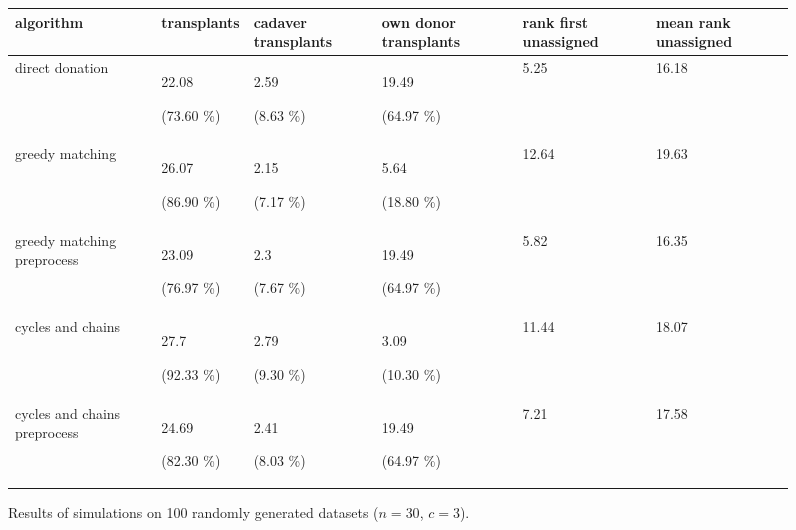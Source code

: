 \documentclass[english]{article}
\begin{document}
\begin{figure}[ht]

    \centering
    \begin{adjustbox}{width=\textwidth}
    \begin{tabular}{|x{0.15\textwidth}|x{0.17\textwidth}|x{0.17\textwidth}|x{0.17\textwidth}|x{0.17\textwidth}|x{0.17\textwidth}|}
        \hline
        \textbf{algorithm} & \textbf{transplants} & \textbf{cadaver transplants} & \textbf{own donor transplants} & \textbf{rank first unassigned} & \textbf{mean rank unassigned} \\
        \hline
        direct donation & 22.08 \par (73.60 \%) & 2.59 \par (8.63 \%) & 19.49 \par (64.97 \%) & 5.25 & 16.18 \\
        \hline
        greedy matching & 26.07 \par (86.90 \%) & 2.15 \par (7.17 \%) & 5.64 \par (18.80 \%) & 12.64 & 19.63 \\
        \hline
        greedy matching preprocess & 23.09 \par (76.97 \%) & 2.3 \par (7.67 \%) & 19.49 \par (64.97 \%) & 5.82 & 16.35 \\
        \hline
        cycles and chains & 27.7 \par (92.33 \%) & 2.79 \par (9.30 \%) & 3.09 \par (10.30 \%) & 11.44 & 18.07 \\
        \hline
        cycles and chains preprocess & 24.69 \par (82.30 \%) & 2.41 \par (8.03 \%) & 19.49 \par (64.97 \%) & 7.21 & 17.58 \\
        \hline
    \end{tabular}
    \end{adjustbox}
    \caption{Results of simulations on 100 randomly generated datasets ($n=30$, $c=3$).}
    \label{simul}
\end{figure}
\end{document}
